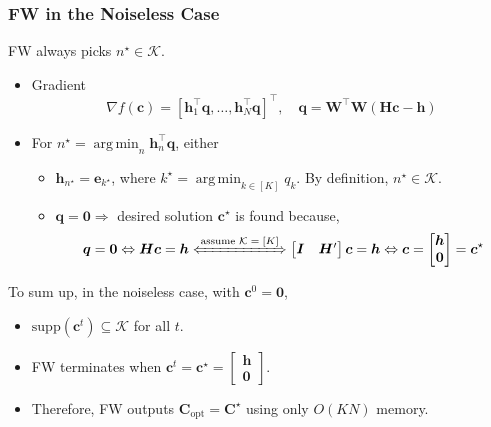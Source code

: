 \documentclass[10pt,xcolor={usenames,dvipsnames,table}]{beamer}
\newcommand{\T}{\!\top\!}
\DeclareMathOperator*{\argmin}{arg\,min}
\begin{document}
\begin{frame}[label=fine]
    \frametitle{FW in the Noiseless Case}
    \begin{block}
        
    FW always picks $n^{\star} \in \mathcal{K}$.
    \end{block}
    \begin{itemize}
        \item Gradient
    \begin{equation*}
        \nabla f(\mathbf{c}) 
        = [\bm{h}_1^{\T}\bm{q}, \ldots , \bm{h}_N^{\T}\bm{q}]^{\T}, \quad \bm{q} = \bm{W}^{\T}\bm{W}(\bm{H}\bm{c}-\bm{h})
    \end{equation*}
    \item For $n^{\star} = \argmin_{n} \bm{h}_n^{\T}\bm{q}$, either
    \begin{itemize}
        \item $\bm{h}_{n^{\star}} = \bm{e}_{k^{\star}}$, where $k^{\star} = \argmin_{k \in [K]} q_k$. By definition, $n^{\star} \in \mathcal{K}$.
        \item $\bm{q} = \bm{0} \Rightarrow$ desired solution $\bm{c}^{\star}$  is found because, 
            \[
            \bm{q} = \bm{0} \Leftrightarrow
            \bm{H}\bm{c} = \bm{h} 
            \xLeftrightarrow{\text{assume $\mathcal{K}=[K]$}}
            \begin{bmatrix}
                \bm{I} & \bm{H}'
            \end{bmatrix}  \bm{c} = \bm{h}
            \Leftrightarrow 
            \bm{c} = \begin{bmatrix}
            \bm{h} \\ \bm{0}
            \end{bmatrix} =\bm{c}^{\star}
            \] 
    \end{itemize}
    \end{itemize}

    To sum up, in the noiseless case, with $\bm{c}^{0} = \bm{0}$,
    \begin{itemize}
        \item $\text{supp}(\bm{c}^{t}) \subseteq \mathcal{K}$ for all $t$.
        \item FW terminates when $\bm{c}^{t} = \bm{c}^{\star} = \begin{bmatrix}
        \bm{h} \\ \bm{0}
        \end{bmatrix}$.
    \item Therefore, FW outputs $\bm{C}_{\text{opt}} = \bm{C}^{\star}$ using only $O(KN)$ memory.
    \end{itemize}
    

\end{frame}
\end{document}
